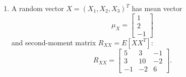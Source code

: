 \documentclass[11pt]{article}
\newcommand{\solution}{
    \vspace{0.3cm}
    \noindent\textbf{\textcolor{blue}{Solution:}}
    \vspace{0.3cm}
}
\begin{document}
\begin{enumerate}[label=\textbf{Question-\arabic*:}, leftmargin=*]
\[\[A processing unit forms $Y = AX$. Find:
\begin{enumerate}[label=(\alph*)]
    \item $\mu_Y$,
    \item $\Sigma_Y$,
    \item which component of $Y$ has the largest variance.
\end{enumerate}

\solution

\textbf{(a) Mean vector}

\[
\mu_Y = A\mu_X =
\begin{bmatrix}
1 & 1 & 0\\
0 & 2 & -1\\
1 & 0 & 1
\end{bmatrix}
\begin{bmatrix}
2\\
0\\
-1
\end{bmatrix}
=
\begin{bmatrix}
2\\
1\\
1
\end{bmatrix}
\]

\textbf{(b) Covariance matrix}

\[
\Sigma_Y = A\Sigma_X A^T
\]

\[
\Sigma_Y =
\begin{bmatrix}
15 & 11 & 6\\
11 & 28 & -1\\
6 & -1 & 12
\end{bmatrix}
\]

\textbf{(c) Largest variance}

\[
\mathrm{Var}(Y_1)=15,\;
\mathrm{Var}(Y_2)=28,\;
\mathrm{Var}(Y_3)=12
\]

\[
\Rightarrow Y_2 \text{ has the largest variance}
\]

\newpage
\item A random vector $X = (X_1, X_2, X_3)^T$ has mean vector
\[
\mu_X =
\begin{bmatrix}1\\2\\-1\end{bmatrix}
\]
and second-moment matrix $R_{XX} = E[XX^T]$:
\[
R_{XX} =
\begin{bmatrix}5&3&-1\\3&10&-2\\-1&-2&6\end{bmatrix}.
\]

\]\]
\end{enumerate}
\end{document}
